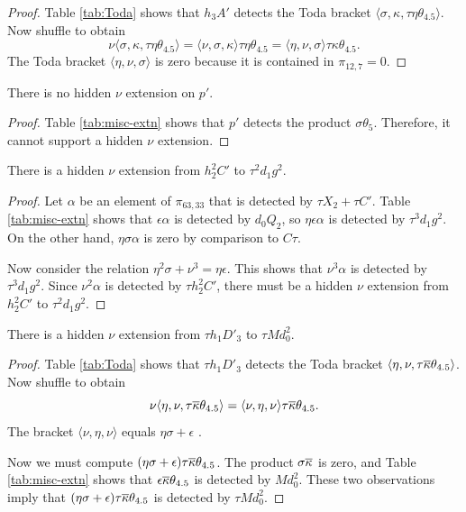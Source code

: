 \begin{proof}
Table \ref{tab:Toda} shows that $h_3 A'$ detects the Toda bracket
$\langle \sigma, \kappa, \tau \eta \theta_{4.5} \rangle$.
Now shuffle to obtain
\[
\nu \langle \sigma, \kappa, \tau \eta \theta_{4.5} \rangle = 
\langle \nu, \sigma, \kappa \rangle \tau \eta \theta_{4.5} =
\langle \eta, \nu, \sigma \rangle \tau \kappa \theta_{4.5}.
\]
The Toda bracket
$\langle \eta, \nu, \sigma \rangle$ is zero because
it is contained in $\pi_{12,7} = 0$.
\end{proof}

\begin{lemma}
\label{lem:nu-p'}
There is no hidden $\nu$ extension on $p'$.
\end{lemma}

\begin{proof}
Table \ref{tab:misc-extn} shows that 
$p'$ detects the product $\sigma \theta_5$.
Therefore, it cannot support a hidden $\nu$ extension.
\end{proof}

\begin{lemma}
\label{lem:nu-h2^2C'}
There is a hidden $\nu$ extension from $h_2^2 C'$ to $\tau^2 d_1 g^2$.
\end{lemma}

\begin{proof}
Let $\alpha$ be an element of $\pi_{63,33}$ that is detected by
$\tau X_2 + \tau C'$.
Table \ref{tab:misc-extn} shows that 
$\epsilon \alpha$ is detected by $d_0 Q_2$, so
$\eta \epsilon \alpha$ is detected by $\tau^3 d_1 g^2$.
On the other hand,
$\eta \sigma \alpha$ is zero by comparison to $C\tau$.

Now consider the relation $\eta^2 \sigma + \nu^3 = \eta \epsilon$.
This shows that $\nu^3 \alpha$ is detected by $\tau^3 d_1 g^2$.
Since $\nu^2 \alpha$ is detected by $\tau h_2^2 C'$,
there must be a hidden $\nu$ extension from
$h_2^2 C'$ to $\tau^2 d_1 g^2$.
\end{proof}

\begin{lemma}
\label{lem:nu-th1D3'}
There is a hidden $\nu$ extension from $\tau h_1 D'_3$ to
$\tau M d_0^2$.
\end{lemma}

\begin{proof}
Table \ref{tab:Toda} shows that $\tau h_1 D'_3$ detects the 
Toda bracket $\langle \eta, \nu, \tau \overline{\kappa} \theta_{4.5} \rangle$.
Now shuffle to obtain
\[
\nu \langle \eta, \nu, \tau \overline{\kappa} \theta_{4.5} \rangle = 
\langle \nu, \eta, \nu \rangle \tau \overline{\kappa} \theta_{4.5}.
\]
The bracket $\langle \nu, \eta, \nu \rangle$
equals $\eta \sigma + \epsilon$ \cite{Toda62}.

Now we must compute 
$(\eta \sigma + \epsilon) \tau \overline{\kappa} \theta_{4.5}$.
The product $\sigma \overline{\kappa}$ is zero, and
Table \ref{tab:misc-extn} shows that
$\epsilon \overline{\kappa} \theta_{4.5}$ is detected by $M d_0^2$.
These two observations imply that
$(\eta \sigma + \epsilon) \tau \overline{\kappa} \theta_{4.5}$
is detected by $\tau M d_0^2$.
\end{proof}

